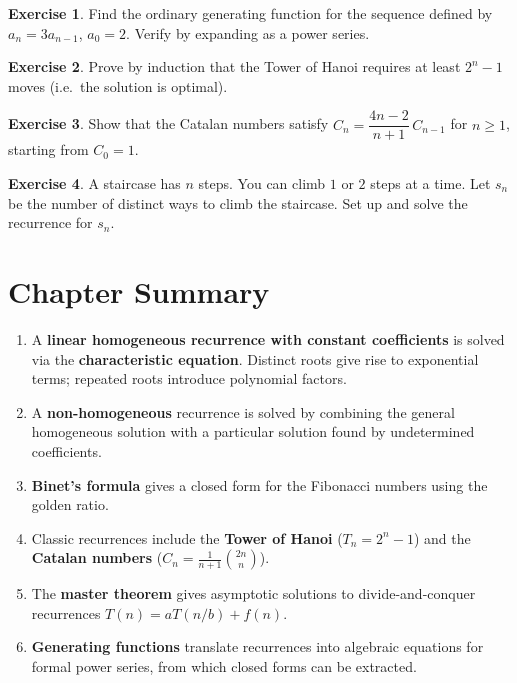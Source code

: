 \documentclass[12pt,a4paper,openany]{book}
\theoremstyle{definition}
\newtheorem{exercise}{Exercise}[chapter]
\theoremstyle{plain}
\theoremstyle{remark}
\begin{document}
\begin{exercise}\label{exo:rec7}
Find the ordinary generating function for the sequence defined by
$a_n = 3a_{n-1}$, $a_0 = 2$.  Verify by expanding as a power series.
\end{exercise}

\begin{exercise}\label{exo:rec8}
Prove by induction that the Tower of Hanoi requires at least $2^n - 1$
moves (i.e.\ the solution is optimal).
\end{exercise}

\begin{exercise}\label{exo:rec9}
Show that the Catalan numbers satisfy
$C_n = \dfrac{4n-2}{n+1}\, C_{n-1}$ for $n \ge 1$, starting from
$C_0 = 1$.
\end{exercise}

\begin{exercise}\label{exo:rec10}
A staircase has $n$ steps.  You can climb $1$ or $2$ steps at a time.
Let $s_n$ be the number of distinct ways to climb the staircase.
Set up and solve the recurrence for $s_n$.
\end{exercise}

\section{Chapter Summary}\label{sec:rec-summary}

\begin{enumerate}
\item A \textbf{linear homogeneous recurrence with constant coefficients}
      is solved via the \textbf{characteristic equation}.  Distinct roots
      give rise to exponential terms; repeated roots introduce polynomial
      factors.
\item A \textbf{non-homogeneous} recurrence is solved by combining the
      general homogeneous solution with a particular solution found by
      undetermined coefficients.
\item \textbf{Binet's formula} gives a closed form for the Fibonacci
      numbers using the golden ratio.
\item Classic recurrences include the \textbf{Tower of Hanoi}
      ($T_n = 2^n - 1$) and the \textbf{Catalan numbers}
      ($C_n = \frac{1}{n+1}\binom{2n}{n}$).
\item The \textbf{master theorem} gives asymptotic solutions to
      divide-and-conquer recurrences $T(n) = aT(n/b) + f(n)$.
\item \textbf{Generating functions} translate recurrences into algebraic
      equations for formal power series, from which closed forms can be
      extracted.
\end{enumerate}
\end{document}
